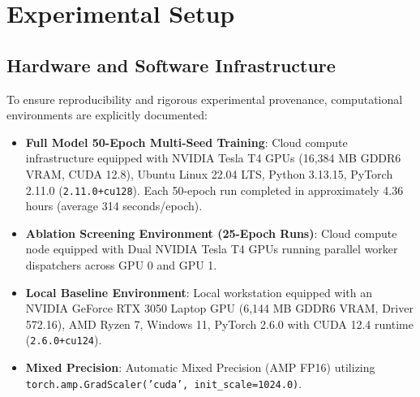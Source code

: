 \documentclass[journal]{IEEEtran}
\begin{document}
\section{Experimental Setup}

\subsection{Hardware and Software Infrastructure}
To ensure reproducibility and rigorous experimental provenance, computational environments are explicitly documented:
\begin{itemize}
    \item \textbf{Full Model 50-Epoch Multi-Seed Training}: Cloud compute infrastructure equipped with NVIDIA Tesla T4 GPUs (16,384 MB GDDR6 VRAM, CUDA 12.8), Ubuntu Linux 22.04 LTS, Python 3.13.15, PyTorch 2.11.0 (\texttt{2.11.0+cu128}). Each 50-epoch run completed in approximately 4.36 hours (average 314 seconds/epoch).
    \item \textbf{Ablation Screening Environment (25-Epoch Runs)}: Cloud compute node equipped with Dual NVIDIA Tesla T4 GPUs running parallel worker dispatchers across GPU 0 and GPU 1.
    \item \textbf{Local Baseline Environment}: Local workstation equipped with an NVIDIA GeForce RTX 3050 Laptop GPU (6,144 MB GDDR6 VRAM, Driver 572.16), AMD Ryzen 7, Windows 11, PyTorch 2.6.0 with CUDA 12.4 runtime (\texttt{2.6.0+cu124}).
    \item \textbf{Mixed Precision}: Automatic Mixed Precision (AMP FP16) utilizing \texttt{torch.amp.GradScaler('cuda', init\_scale=1024.0)}.
\end{itemize}
\end{document}
